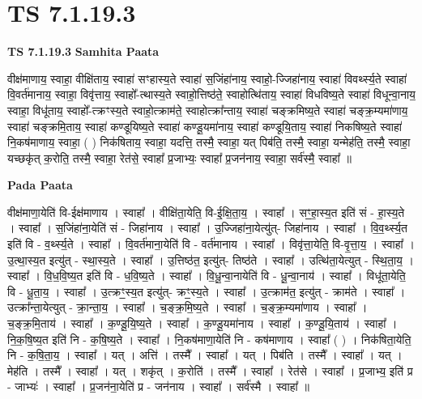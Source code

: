 \documentclass[17pt]{extarticle}
\begin{document}
\section*{ TS 7.1.19.3 }

\textbf{TS 7.1.19.3 } \newline
\textbf{Samhita Paata} \newline

वीक्ष॑माणाय॒ स्वाहा॒ वीक्षि॑ताय॒ स्वाहा॑ सꣳहास्य॒ते स्वाहा॑ स॒जिंहा॑नाय॒ स्वाहो॒-ज्जिहा॑नाय॒ स्वाहा॑ विवर्थ्स्य॒ते स्वाहा॑ वि॒वर्त॑मानाय॒ स्वाहा॒ विवृ॑त्ताय॒ स्वाहो᳚-त्थास्य॒ते स्वाहो॒त्तिष्ठ॑ते॒ स्वाहोत्थि॑ताय॒ स्वाहा॑ विधविष्य॒ते स्वाहा॑ विधून्वा॒नाय॒ स्वाहा॒ विधू॑ताय॒ स्वाहो᳚-त्क्रꣳस्य॒ते स्वाहो॒त्क्राम॑ते॒ स्वाहोत्क्रा᳚न्ताय॒ स्वाहा॑ चङ्क्रमिष्य॒ते स्वाहा॑ चङ्क्र॒म्यमा॑णाय॒ स्वाहा॑ चङ्क्रमि॒ताय॒ स्वाहा॑ कण्डूयिष्य॒ते स्वाहा॑ कण्डू॒यमा॑नाय॒ स्वाहा॑ कण्डूयि॒ताय॒ स्वाहा॑ निकषिष्य॒ते स्वाहा॑ नि॒कष॑माणाय॒ स्वाहा॒ ( ) निक॑षिताय॒ स्वाहा॒ यदत्ति॒ तस्मै॒ स्वाहा॒ यत् पिब॑ति॒ तस्मै॒ स्वाहा॒ यन्मेह॑ति॒ तस्मै॒ स्वाहा॒ यच्छकृ॑त् क॒रोति॒ तस्मै॒ स्वाहा॒ रेत॑से॒ स्वाहा᳚ प्र॒जाभ्यः॒ स्वाहा᳚ प्र॒जन॑नाय॒ स्वाहा॒ सर्व॑स्मै॒ स्वाहा᳚ ॥ \newline

\textbf{Pada Paata} \newline

वीक्ष॑माणा॒येति॑ वि-ईक्ष॑माणाय । स्वाहा᳚ । वीक्षि॑ता॒येति॒ वि-ई॒क्षि॒ता॒य॒ । स्वाहा᳚ । सꣳ॒॒हा॒स्य॒त इति॑ सं - हा॒स्य॒ते । स्वाहा᳚ । स॒जिंहा॑ना॒येति॑ सं - जिहा॑नाय । स्वाहा᳚ । उ॒ज्जिहा॑ना॒येत्यु॑त्- जिहा॑नाय । स्वाहा᳚ । वि॒व॒र्थ्स्य॒त इति॑ वि - व॒र्थ्स्य॒ते । स्वाहा᳚ । वि॒वर्त॑माना॒येति॑ वि - वर्त॑मानाय । स्वाहा᳚ । विवृ॑त्ता॒येति॒ वि-वृ॒त्ता॒य॒ । स्वाहा᳚ । उ॒त्था॒स्य॒त इत्यु॑त् - स्था॒स्य॒ते । स्वाहा᳚ । उ॒त्तिष्ठ॑त॒ इत्यु॑त्- तिष्ठ॑ते । स्वाहा᳚ । उत्थि॑ता॒येत्युत् - स्थि॒ता॒य॒ । स्वाहा᳚ । वि॒ध॒वि॒ष्य॒त इति॑ वि - ध॒वि॒ष्य॒ते । स्वाहा᳚ । वि॒धू॒न्वा॒नायेति॑ वि - धू॒न्वा॒नाय॑ । स्वाहा᳚ । विधू॑ता॒येति॒ वि - धू॒ता॒य॒ । स्वाहा᳚ । उ॒त्क्रꣳ॒॒स्य॒त इत्यु॑त्- क्रꣳ॒॒स्य॒ते । स्वाहा᳚ । उ॒त्क्राम॑त॒ इत्यु॑त् - क्राम॑ते । स्वाहा᳚ । उत्क्रा᳚न्ता॒येत्युत् - क्रा॒न्ता॒य॒ । स्वाहा᳚ । च॒ङ्क्र॒मि॒ष्य॒ते । स्वाहा᳚ । च॒ङ्क्र॒म्यमा॑णाय । स्वाहा᳚ । च॒ङ्क्र॒मि॒ताय॑ । स्वाहा᳚ । क॒ण्डू॒यि॒ष्य॒ते । स्वाहा᳚ । क॒ण्डू॒यमा॑नाय । स्वाहा᳚ । क॒ण्डू॒यि॒ताय॑ । स्वाहा᳚ । नि॒क॒षि॒ष्य॒त इति॑ नि - क॒षि॒ष्य॒ते । स्वाहा᳚ । नि॒कष॑माणा॒येति॑ नि - कष॑माणाय । स्वाहा᳚ ( ) । निक॑षिता॒येति॒ नि - क॒षि॒ता॒य॒ । स्वाहा᳚ । यत् । अत्ति॑ । तस्मै᳚ । स्वाहा᳚ । यत् । पिब॑ति । तस्मै᳚ । स्वाहा᳚ । यत् । मेह॑ति । तस्मै᳚ । स्वाहा᳚ । यत् । शकृ॑त् । क॒रोति॑ । तस्मै᳚ । स्वाहा᳚ । रेत॑से । स्वाहा᳚ । प्र॒जाभ्य॒ इति॑ प्र - जाभ्यः॑ । स्वाहा᳚ । प्र॒जन॑ना॒येति॑ प्र - जन॑नाय । स्वाहा᳚ । सर्व॑स्मै । स्वाहा᳚ ॥  \newline
\end{document}
